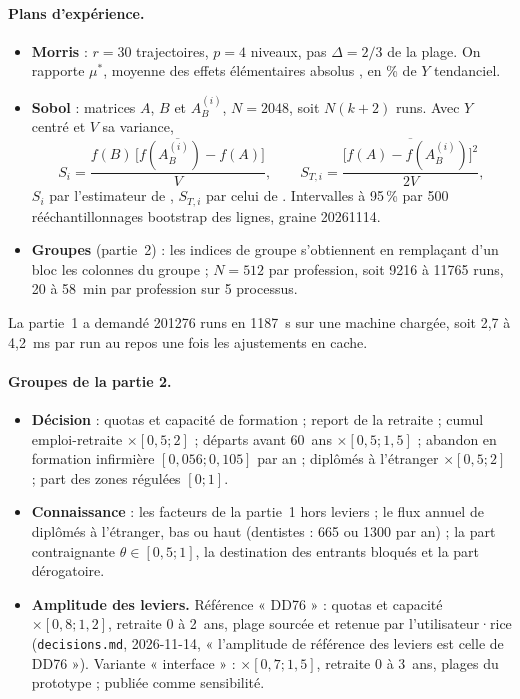 \paragraph{Plans d'expérience.}
\begin{itemize}
  \item \textbf{Morris} \citep{morris1991} : $r = 30$ trajectoires, $p = 4$ niveaux, pas $\Delta = 2/3$ de la
        plage. On rapporte $\mu^*$, moyenne des effets élémentaires absolus \citep{campolongo2007}, en \% de $Y$
        tendanciel.
  \item \textbf{Sobol} \citep{sobol2001} : matrices $A$, $B$ et $A_B^{(i)}$, $N = 2048$, soit $N(k+2)$ runs. Avec
        $Y$ centré et $V$ sa variance,
        \begin{equation}\label{sen:eq:sobol}
          S_i = \frac{\overline{f(B)\,\bigl[f(A_B^{(i)}) - f(A)\bigr]}}{V}, \qquad
          S_{T,i} = \frac{\overline{\bigl[f(A) - f(A_B^{(i)})\bigr]^2}}{2V},
        \end{equation}
        $S_i$ par l'estimateur de \citet{saltelli2010}, $S_{T,i}$ par celui de \citet{jansen1999}. Intervalles à
        95\,\% par 500 rééchantillonnages bootstrap des lignes, graine \num{20261114}.
  \item \textbf{Groupes} (partie~2) : les indices de groupe s'obtiennent en remplaçant d'un bloc les colonnes du
        groupe ; $N = 512$ par profession, soit \num{9216} à \num{11765}\mesure{} runs, 20 à 58\mesure{}~min par
        profession sur 5 processus.
\end{itemize}
La partie~1 a demandé \num{201276}\mesure{} runs en \SI{1187}{\second}\mesure{} sur une machine chargée, soit 2,7 à
4,2\mesure{}~ms par run au repos une fois les ajustements en cache.

\paragraph{Groupes de la partie 2.}
\begin{itemize}
  \item \textbf{Décision} : quotas et capacité de formation ; report de la retraite ; cumul emploi-retraite
        $\times [0{,}5 ; 2]$ ; départs avant 60~ans $\times [0{,}5 ; 1{,}5]$ ; abandon en formation infirmière
        $[0{,}056 ; 0{,}105]$\derive{} par an ; diplômés à l'étranger $\times [0{,}5 ; 2]$ ; part des zones
        régulées $[0 ; 1]$.
  \item \textbf{Connaissance} : les facteurs de la partie~1 hors leviers ; le flux annuel de diplômés à l'étranger,
        bas ou haut (dentistes : 665 ou \num{1300}\derive{} par an) ; la part contraignante
        $\theta \in [0{,}5 ; 1]$\suppose{}, la destination des entrants bloqués et la part dérogatoire.
  \item \textbf{Amplitude des leviers.} Référence « DD76 » : quotas et capacité $\times [0{,}8 ; 1{,}2]$, retraite
        0 à 2~ans, plage sourcée \citep{drees2021dd76} et retenue par l'utilisateur·rice
        (\texttt{decisions.md}, 2026-11-14, « l'amplitude de référence des leviers est celle de DD76 »). Variante
        « interface » : $\times [0{,}7 ; 1{,}5]$, retraite 0 à 3~ans, plages du prototype ; publiée comme
        sensibilité.
\end{itemize}

